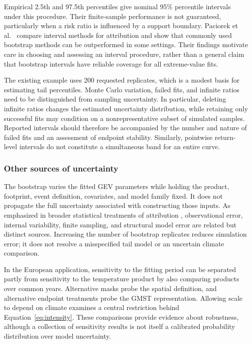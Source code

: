 \documentclass[11pt]{article}
\begin{document}
Empirical 2.5th and 97.5th percentiles give nominal 95\% percentile
intervals under this procedure. Their finite-sample performance is not
guaranteed, particularly when a risk ratio is influenced by a support
boundary. Paciorek et al.\ \cite{paciorek2018quantifying} compare
interval methods
for attribution and show that commonly used bootstrap methods can be
outperformed in some settings. Their findings motivate care in choosing
and assessing an interval procedure, rather than a general claim that
bootstrap intervals have reliable coverage for all extreme-value fits.

The existing example uses 200 requested replicates, which is a modest
basis for estimating tail percentiles. Monte Carlo variation, failed
fits, and infinite ratios need to be distinguished from sampling
uncertainty. In particular, deleting infinite ratios changes the
estimated uncertainty distribution, while retaining only successful
fits may condition on a nonrepresentative subset of simulated samples.
Reported intervals should therefore be accompanied by the number and
nature of failed fits and an assessment of endpoint stability. Similarly,
pointwise return-level intervals do not constitute a simultaneous band
for an entire curve.

\subsubsection{Other sources of uncertainty}
The bootstrap varies the fitted GEV parameters while holding the product,
footprint, event definition, covariates, and model family fixed. It does
not propagate the full uncertainty associated with constructing those
inputs. As emphasized in broader statistical treatments of attribution
\cite{naveau2020statistical}, observational error, internal
variability, finite
sampling, and structural model error are related but distinct sources.
Increasing the number of bootstrap replicates reduces simulation error;
it does not resolve a misspecified tail model or an uncertain climate
comparison.

In the European application, sensitivity to the fitting period can be
separated partly from sensitivity to the temperature product by also
comparing products over common years. Alternative masks probe the
spatial definition, and alternative endpoint treatments probe the GMST
representation. Allowing scale to depend on climate examines a central
restriction behind Equation~\eqref{eq:intensity}. These comparisons
provide evidence about robustness, although a collection of sensitivity
results is not itself a calibrated probability distribution over model
uncertainty.
\end{document}
